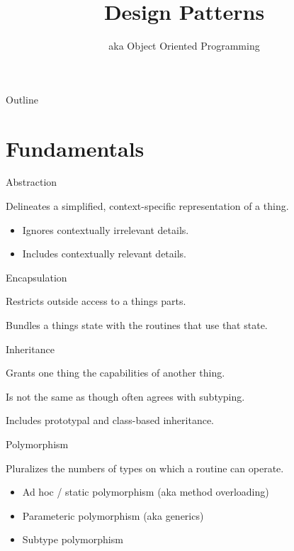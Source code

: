 \documentclass{beamer}
\title{Design Patterns}
\subtitle{aka Object Oriented Programming}
\begin{document}
\begin{frame}
  \titlepage
\end{frame}

\begin{frame}{Outline}
  \tableofcontents
\end{frame}

\section{Fundamentals}

\begin{frame}{Abstraction}
    \par Delineates a simplified, context-specific representation of a thing.
    \begin{itemize}
        \item Ignores contextually irrelevant details.
        \item Includes contextually relevant details.
    \end{itemize}
\end{frame}

\begin{frame}{Encapsulation}
    \par Restricts outside access to a things parts.
    \par Bundles a things state with the routines that use that state.
\end{frame}

\begin{frame}{Inheritance}
    \par Grants one thing the capabilities of another thing.
    \par Is not the same as though often agrees with subtyping.
    \par Includes prototypal and class-based inheritance.
\end{frame}

\begin{frame}{Polymorphism}
    \par Pluralizes the numbers of types on which a routine can operate.
    \begin{itemize}
        \item Ad hoc / static polymorphism (aka method overloading)
        \item Parameteric polymorphism (aka generics)
        \item Subtype polymorphism
    \end{itemize}
\end{frame}
\end{document}
